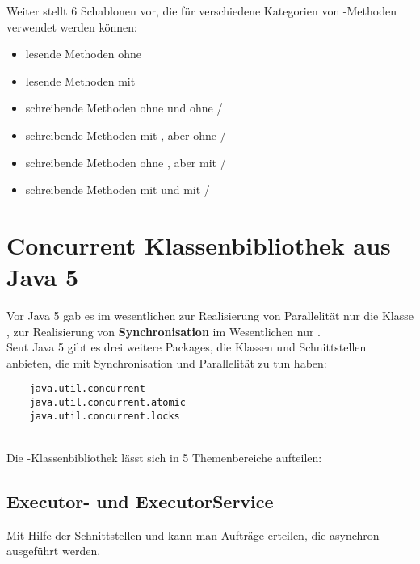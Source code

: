 Weiter stellt \cite{Oec22} 6 Schablonen vor, die für verschiedene Kategorien von -Methoden verwendet werden können:

\begin{itemize}
    \item lesende Methoden ohne 
    \item lesende Methoden mit 
    \item schreibende Methoden ohne  und ohne /
    \item schreibende Methoden mit , aber ohne /
    \item schreibende Methoden ohne , aber mit /
    \item schreibende Methoden mit  und mit /
\end{itemize}


\section{Concurrent Klassenbibliothek aus Java 5}

Vor Java 5 gab es im wesentlichen zur Realisierung von Parallelität nur die Klasse , zur Realisierung von \textbf{Synchronisation} im Wesentlichen nur .\\

\noindent
Seut Java 5 gibt es drei weitere Packages, die Klassen und Schnittstellen anbieten, die mit Synchronisation und Parallelität zu tun haben:



\begin{verbatim}
    java.util.concurrent
    java.util.concurrent.atomic
    java.util.concurrent.locks
\end{verbatim}\\


Die -Klassenbibliothek lässt sich in 5 Themenbereiche aufteilen:

\subsection*{Executor- und ExecutorService}
Mit Hilfe der Schnittstellen  und  kann man Aufträge erteilen, die asynchron ausgeführt werden.\\

